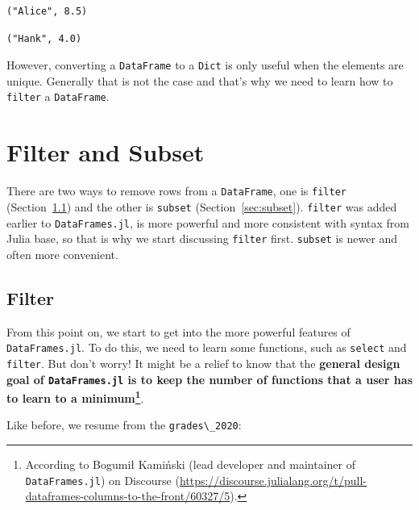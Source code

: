 \documentclass[
  notoc %
]{tufte-book}
\newcommand{\passthrough}[1]{#1}
\begin{document}
\begin{lstlisting}[language=Output]
("Alice", 8.5)
\end{lstlisting}

\begin{lstlisting}[language=Output]
("Hank", 4.0)
\end{lstlisting}

However, converting a \passthrough{\lstinline!DataFrame!} to a
\passthrough{\lstinline!Dict!} is only useful when the elements are
unique. Generally that is not the case and that's why we need to learn
how to \passthrough{\lstinline!filter!} a
\passthrough{\lstinline!DataFrame!}.

\hypertarget{sec:filter_subset}{%
\section{Filter and Subset}\label{sec:filter_subset}}

There are two ways to remove rows from a
\passthrough{\lstinline!DataFrame!}, one is
\passthrough{\lstinline!filter!} (Section~\ref{sec:filter}) and the
other is \passthrough{\lstinline!subset!} (Section~\ref{sec:subset}).
\passthrough{\lstinline!filter!} was added earlier to
\passthrough{\lstinline!DataFrames.jl!}, is more powerful and more
consistent with syntax from Julia base, so that is why we start
discussing \passthrough{\lstinline!filter!} first.
\passthrough{\lstinline!subset!} is newer and often more convenient.

\hypertarget{sec:filter}{%
\subsection{Filter}\label{sec:filter}}

From this point on, we start to get into the more powerful features of
\passthrough{\lstinline!DataFrames.jl!}. To do this, we need to learn
some functions, such as \passthrough{\lstinline!select!} and
\passthrough{\lstinline!filter!}. But don't worry! It might be a relief
to know that the \textbf{general design goal of
\passthrough{\lstinline!DataFrames.jl!} is to keep the number of
functions that a user has to learn to a minimum\footnote{According to
  Bogumił Kamiński (lead developer and maintainer of
  \passthrough{\lstinline!DataFrames.jl!}) on Discourse
  (\url{https://discourse.julialang.org/t/pull-dataframes-columns-to-the-front/60327/5}).}}.

Like before, we resume from the \passthrough{\lstinline!grades\_2020!}:
\end{document}
